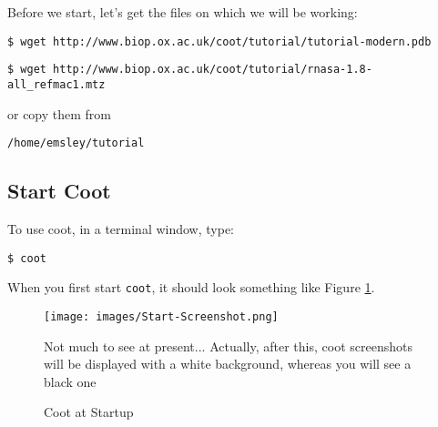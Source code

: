 \documentclass{article}
\newcommand {\atilde} {$_{\char '176}$} %
\begin{document}
Before we start, let's get the files on which we will be working:


\texttt{\small \$ wget http://www.biop.ox.ac.uk/coot/tutorial/tutorial-modern.pdb}

\texttt{\small \$ wget http://www.biop.ox.ac.uk/coot/tutorial/rnasa-1.8-all\_refmac1.mtz}

or copy them from 

\texttt{/home/emsley/tutorial}



\subsection{Start Coot}








To use coot, in a terminal window, type:

\texttt{\$ coot}

When you first start \texttt{coot}, it should look
something like Figure \ref{fig:start-coot}.

\begin{figure}[htbp]
  \begin{center}
    \leavevmode
    \texttt{[image: images/Start-Screenshot.png]}
    \caption{Coot at Startup}{Not much to see at present...
      Actually, after this, coot screenshots will be displayed with a
      white background, whereas you will see a black one}
    \label{fig:start-coot}
  \end{center}
\end{figure}
\end{document}
